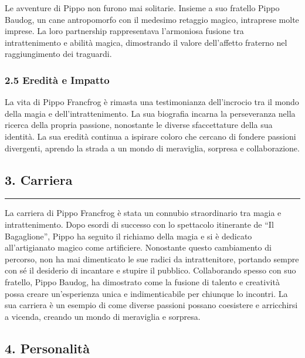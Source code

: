 Le avventure di Pippo non furono mai solitarie. Insieme a suo fratello
Pippo Baudog, un cane antropomorfo con il medesimo retaggio magico,
intraprese molte imprese. La loro partnership rappresentava l'armoniosa
fusione tra intrattenimento e abilità magica, dimostrando il valore
dell'affetto fraterno nel raggiungimento dei traguardi.

\subsubsection{\texorpdfstring{2.5 \textbf{Eredità e
Impatto}}{2.5 Eredità e Impatto}}\label{eredituxe0-e-impatto}

La vita di Pippo Francfrog è rimasta una testimonianza dell'incrocio tra
il mondo della magia e dell'intrattenimento. La sua biografia incarna la
perseveranza nella ricerca della propria passione, nonostante le diverse
sfaccettature della sua identità. La sua eredità continua a ispirare
coloro che cercano di fondere passioni divergenti, aprendo la strada a
un mondo di meraviglia, sorpresa e collaborazione.

\subsection{3. Carriera}\label{carriera}

\begin{center}\rule{0.5\linewidth}{0.5pt}\end{center}

La carriera di Pippo Francfrog è stata un connubio straordinario tra
magia e intrattenimento. Dopo esordi di successo con lo spettacolo
itinerante de ``Il Bagaglione'', Pippo ha seguito il richiamo della
magia e si è dedicato all'artigianato magico come artificiere.
Nonostante questo cambiamento di percorso, non ha mai dimenticato le sue
radici da intrattenitore, portando sempre con sé il desiderio di
incantare e stupire il pubblico. Collaborando spesso con suo fratello,
Pippo Baudog, ha dimostrato come la fusione di talento e creatività
possa creare un'esperienza unica e indimenticabile per chiunque lo
incontri. La sua carriera è un esempio di come diverse passioni possano
coesistere e arricchirsi a vicenda, creando un mondo di meraviglia e
sorpresa.

\subsection{4. Personalità}\label{personalituxe0}

